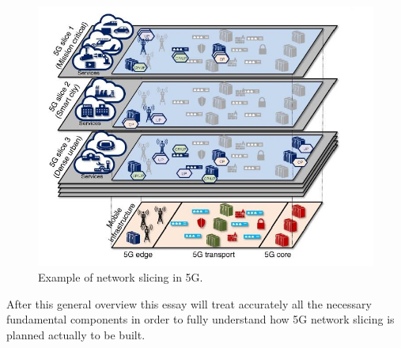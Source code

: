 \documentclass[a4paper,12pt]{report} %
\begin{document}
\begin{figure}[H]
\centering
\includegraphics[scale=0.65]{pics/1.JPG}
\caption{Example of network slicing in 5G. \cite{al20185g}}
\label{layers}
\end{figure}
After this general overview this essay will treat accurately all the necessary fundamental components in order to fully understand how 5G network slicing is planned actually to be built.


\newpage
\end{document}
